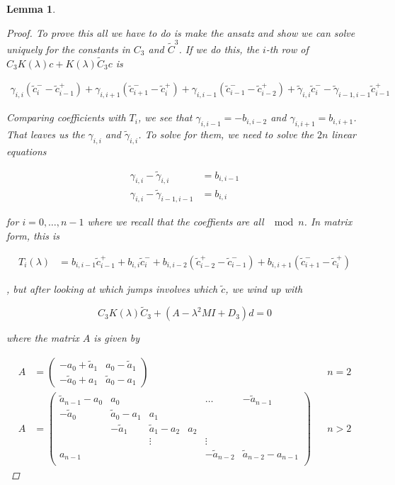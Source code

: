 \documentclass[12pt]{article}
\newtheorem{lemma}{Lemma}
\begin{document}
\begin{lemma}
\begin{proof}
To prove this all we have to do is make the ansatz and show we can solve uniquely for the constants in $C_3$ and $\tilde{C}^3$. If we do this, the $i$-th row of $C_3 K(\lambda) c + K(\lambda) \tilde{C}_3 c$ is 

\begin{align*}
\gamma_{i,i}(\tilde{c}_i^- - \tilde{c}_{i-1}^+) 
+ \gamma_{i,i+1}(\tilde{c}_{i+1}^- - \tilde{c}_i^+)
+ \gamma_{i,i-1}(\tilde{c}_{i-1}^- - \tilde{c}_{i-2}^+)
+ \tilde{\gamma}_{i,i} \tilde{c}_i^- - \tilde{\gamma}_{i-1,i-1} \tilde{c}_{i-1}^+
\end{align*}

Comparing coefficients with $T_i$, we see that $\gamma_{i,i-1} = -b_{i,i-2}$ and $\gamma_{i,i+1} = b_{i,i+1}$. That leaves us the $\gamma_{i,i}$ and $\tilde{\gamma}_{i,i}$. To solve for them, we need to solve the $2n$ linear equations

\begin{align*}
\gamma_{i,i} - \tilde{\gamma}_{i,i} &= b_{i,i-1}\\
\gamma_{i,i} - \tilde{\gamma}_{i-1,i-1} &= b_{i,i} 
\end{align*}

for $i = 0, \dots, n-1$ where we recall that the coeffients are all $\mod n$. In matrix form, this is

\begin{align*}
T_i(\lambda) &= b_{i,i-1} \tilde{c}_{i-1}^+ + b_{i,i} \tilde{c}_{i}^- + b_{i,i-2} ( \tilde{c}_{i-2}^+ - \tilde{c}_{i-1}^-) + b_{i,i+1} (\tilde{c}_{i+1}^- - \tilde{c}_i^+)
\end{align*}





, but after looking at which jumps involves which $\tilde{c}$, we wind up with

\[
C_3 K(\lambda) \tilde{C}_3 + (A - \lambda^2 M I + D_3)d = 0
\]

where the matrix $A$ is given by

\begin{align*}
A &= \begin{pmatrix}
-a_0 + \tilde{a}_1 & a_0 - \tilde{a}_1 \\
-\tilde{a}_0 + a_1 & \tilde{a}_0 - a_1
\end{pmatrix} && n = 2 \\
A &= \begin{pmatrix}
\tilde{a}_{n-1} - a_0 & a_0 & & & \dots & -\tilde{a}_{n-1}\\
-\tilde{a}_0 & \tilde{a}_0 - a_1 &  a_1 \\
& -\tilde{a}_1 & \tilde{a}_1 - a_2 &  a_2 \\
& & \vdots & & \vdots \\
a_{n-1} & & & & -\tilde{a}_{n-2} & \tilde{a}_{n-2} - a_{n-1} \\
\end{pmatrix} && n > 2
\end{align*}


\end{proof}
\end{lemma}
\end{document}
